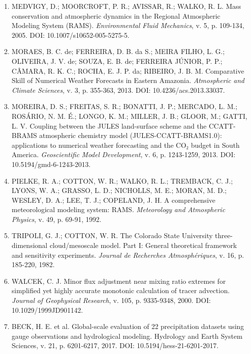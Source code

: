 \documentclass[12pt,a4paper,oneside]{book}
\begin{document}
\begin{enumerate}
  LONGO, K. M.; FREITAS, S. R.; ANDREAE, M. O.; SETZER, A.; PRINS, E.; ARTAXO, P. The Coupled Aerosol and Tracer Transport model to the Brazilian developments on the Regional Atmospheric Modeling System (CATT-BRAMS): Part 2: model sensitivity to the biomass burning inventories. \emph{Atmospheric Chemistry and Physics}, v. 10, p. 5785-5795, 2010. DOI: 10.5194/acp-10-5785-2010.
\item
  MEDVIGY, D.; MOORCROFT, P. R.; AVISSAR, R.; WALKO, R. L. Mass conservation and atmospheric dynamics in the Regional Atmospheric Modeling System (RAMS). \emph{Environmental Fluid Mechanics}, v. 5, p. 109-134, 2005. DOI: 10.1007/s10652-005-5275-5.
\item
  MORAES, B. C. de; FERREIRA, D. B. da S.; MEIRA FILHO, L. G.; OLIVEIRA, J. V. de; SOUZA, E. B. de; FERREIRA JÚNIOR, P. P.; CÂMARA, R. K. C.; ROCHA, E. J. P. da; RIBEIRO, J. B. M. Comparative Skill of Numerical Weather Forecasts in Eastern Amazonia. \emph{Atmospheric and Climate Sciences}, v. 3, p. 355-363, 2013. DOI: 10.4236/acs.2013.33037.
\item
  MOREIRA, D. S.; FREITAS, S. R.; BONATTI, J. P.; MERCADO, L. M.; ROSÁRIO, N. M. É.; LONGO, K. M.; MILLER, J. B.; GLOOR, M.; GATTI, L. V. Coupling between the JULES land-surface scheme and the CCATT-BRAMS atmospheric chemistry model (JULES-CCATT-BRAMS1.0): applications to numerical weather forecasting and the CO₂ budget in South America. \emph{Geoscientific Model Development}, v. 6, p. 1243-1259, 2013. DOI: 10.5194/gmd-6-1243-2013.
\item
  PIELKE, R. A.; COTTON, W. R.; WALKO, R. L.; TREMBACK, C. J.; LYONS, W. A.; GRASSO, L. D.; NICHOLLS, M. E.; MORAN, M. D.; WESLEY, D. A.; LEE, T. J.; COPELAND, J. H. A comprehensive meteorological modeling system: RAMS. \emph{Meteorology and Atmospheric Physics}, v. 49, p. 69-91, 1992.
\item
  TRIPOLI, G. J.; COTTON, W. R. The Colorado State University three-dimensional cloud/mesoscale model. Part I: General theoretical framework and sensitivity experiments. \emph{Journal de Recherches Atmosphériques}, v. 16, p. 185-220, 1982.
\item
  WALCEK, C. J. Minor flux adjustment near mixing ratio extremes for simplified yet highly accurate monotonic calculation of tracer advection. \emph{Journal of Geophysical Research}, v. 105, p. 9335-9348, 2000. DOI: 10.1029/1999JD901142.
\item
  BECK, H. E. et al. Global-scale evaluation of 22 precipitation datasets using gauge observations and hydrological modeling. Hydrology and Earth System Sciences, v. 21, p. 6201-6217, 2017. DOI: 10.5194/hess-21-6201-2017.

\end{enumerate}
\end{document}
